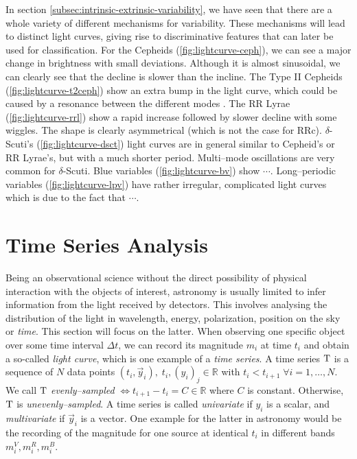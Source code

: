 
In section \ref{subsec:intrinsic-extrinsic-variability}, we have seen that there are a whole variety of different mechanisms for variability. These mechanisms will lead to distinct light curves, giving rise to discriminative features that can later be used for classification. For the Cepheids (\ref{fig:lightcurve-ceph}), we can see a major change in brightness with small deviations. Although it is almost sinusoidal, we can clearly see that the decline is slower than the incline. The Type II Cepheids (\ref{fig:lightcurve-t2ceph}) show an extra bump in the light curve, which could be caused by a resonance between the different modes \citep{caputo1999}. The RR Lyrae (\ref{fig:lightcurve-rrl}) show a rapid increase followed by slower decline with some wiggles. The shape is clearly asymmetrical (which is not the case for RRc). $\delta$-Scuti's (\ref{fig:lightcurve-dsct}) light curves are in general similar to Cepheid's or RR Lyrae's, but with a much shorter period. Multi--mode oscillations are very common for $\delta$-Scuti. Blue variables (\ref{fig:lightcurve-bv}) show $\cdots$. Long--periodic variables (\ref{fig:lightcurve-lpv}) have rather irregular, complicated light curves which is due to the fact that $\cdots$.

\section{Time Series Analysis}
\label{sec:statistical-analysis-time-series}

Being an observational science without the direct possibility of physical interaction with the objects of interest, astronomy is usually limited to infer information from the light received by detectors. This involves analysing the distribution of the light in wavelength, energy, polarization, position on the sky or \emph{time}. This section will focus on the latter. When observing one specific object over some time interval $\Delta t$, we can record its magnitude $m_i$ at time $t_i$ and obtain a so-called \emph{light curve}, which is one example of a \emph{time series}. A time series $\mathrm{T}$ is a sequence of $N$ data points $(t_i, \vec y_i),\; t_i,(y_i)_j \in \mathbb{R}$ with $t_i < t_{i+1} \; \forall i = 1,\ldots,N$. We call $\mathrm{T}$ \emph{evenly--sampled} $\Leftrightarrow t_{i+1} - t_i = C \in \mathbb{R}$ where $C$ is constant. Otherwise, $\mathrm{T}$ is \emph{unevenly--sampled}. A time series is called \emph{univariate} if $y_i$ is a scalar, and \emph{multivariate} if $\vec y_i$ is a vector. One example for the latter in astronomy would be the recording of the magnitude for one source at identical $t_i$ in different bands $m_i^{V}, m_i^{R}, m_i^{B}$.\\

